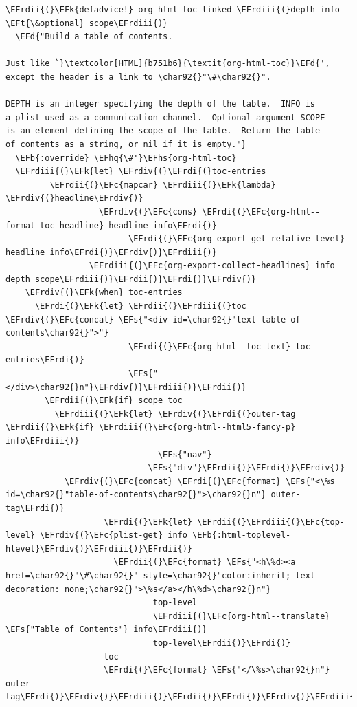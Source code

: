 \documentclass{scrartcl}
\newcommand{\EFk}[1]{\textcolor{EFk}{#1}} %
\newcommand{\EFd}[1]{\textcolor{EFd}{\textit{#1}}} %
\newcommand{\EFt}[1]{\textcolor{EFt}{#1}} %
\newcommand{\EFs}[1]{\textcolor{EFs}{#1}} %
\newcommand{\EFb}[1]{\textcolor{EFb}{#1}} %
\newcommand{\EFc}[1]{\textcolor{EFc}{#1}} %
\newcommand{\EFhq}[1]{\textcolor{EFhq}{#1}} %
\newcommand{\EFhs}[1]{\textcolor{EFhs}{#1}} %
\newcommand{\EFrdi}[1]{\textcolor{EFrdi}{#1}} %
\newcommand{\EFrdii}[1]{\textcolor{EFrdii}{#1}} %
\newcommand{\EFrdiii}[1]{\textcolor{EFrdiii}{#1}} %
\newcommand{\EFrdiv}[1]{\textcolor{EFrdiv}{#1}} %
\begin{document}
\begin{Code}
\begin{Verbatim}[]
\EFrdii{(}\EFk{defadvice!} org-html-toc-linked \EFrdiii{(}depth info \EFt{\&optional} scope\EFrdiii{)}
  \EFd{"Build a table of contents.

Just like `}\textcolor[HTML]{b751b6}{\textit{org-html-toc}}\EFd{', except the header is a link to \char92{}"\#\char92{}".

DEPTH is an integer specifying the depth of the table.  INFO is
a plist used as a communication channel.  Optional argument SCOPE
is an element defining the scope of the table.  Return the table
of contents as a string, or nil if it is empty."}
  \EFb{:override} \EFhq{\#'}\EFhs{org-html-toc}
  \EFrdiii{(}\EFk{let} \EFrdiv{(}\EFrdi{(}toc-entries
         \EFrdii{(}\EFc{mapcar} \EFrdiii{(}\EFk{lambda} \EFrdiv{(}headline\EFrdiv{)}
                   \EFrdiv{(}\EFc{cons} \EFrdi{(}\EFc{org-html--format-toc-headline} headline info\EFrdi{)}
                         \EFrdi{(}\EFc{org-export-get-relative-level} headline info\EFrdi{)}\EFrdiv{)}\EFrdiii{)}
                 \EFrdiii{(}\EFc{org-export-collect-headlines} info depth scope\EFrdiii{)}\EFrdii{)}\EFrdi{)}\EFrdiv{)}
    \EFrdiv{(}\EFk{when} toc-entries
      \EFrdi{(}\EFk{let} \EFrdii{(}\EFrdiii{(}toc \EFrdiv{(}\EFc{concat} \EFs{"<div id=\char92{}"text-table-of-contents\char92{}">"}
                         \EFrdi{(}\EFc{org-html--toc-text} toc-entries\EFrdi{)}
                         \EFs{"</div>\char92{}n"}\EFrdiv{)}\EFrdiii{)}\EFrdii{)}
        \EFrdii{(}\EFk{if} scope toc
          \EFrdiii{(}\EFk{let} \EFrdiv{(}\EFrdi{(}outer-tag \EFrdii{(}\EFk{if} \EFrdiii{(}\EFc{org-html--html5-fancy-p} info\EFrdiii{)}
                               \EFs{"nav"}
                             \EFs{"div"}\EFrdii{)}\EFrdi{)}\EFrdiv{)}
            \EFrdiv{(}\EFc{concat} \EFrdi{(}\EFc{format} \EFs{"<\%s id=\char92{}"table-of-contents\char92{}">\char92{}n"} outer-tag\EFrdi{)}
                    \EFrdi{(}\EFk{let} \EFrdii{(}\EFrdiii{(}\EFc{top-level} \EFrdiv{(}\EFc{plist-get} info \EFb{:html-toplevel-hlevel}\EFrdiv{)}\EFrdiii{)}\EFrdii{)}
                      \EFrdii{(}\EFc{format} \EFs{"<h\%d><a href=\char92{}"\#\char92{}" style=\char92{}"color:inherit; text-decoration: none;\char92{}">\%s</a></h\%d>\char92{}n"}
                              top-level
                              \EFrdiii{(}\EFc{org-html--translate} \EFs{"Table of Contents"} info\EFrdiii{)}
                              top-level\EFrdii{)}\EFrdi{)}
                    toc
                    \EFrdi{(}\EFc{format} \EFs{"</\%s>\char92{}n"} outer-tag\EFrdi{)}\EFrdiv{)}\EFrdiii{)}\EFrdii{)}\EFrdi{)}\EFrdiv{)}\EFrdiii{)}\EFrdii{)}


\end{Verbatim}
\end{Code}
\end{document}
